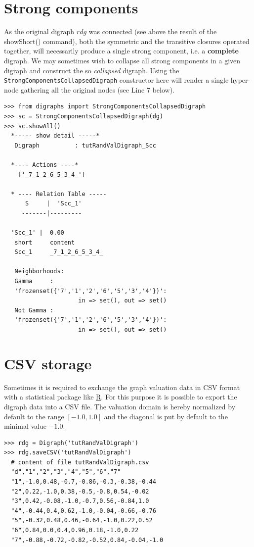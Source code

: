 \section{Strong components}
\label{sec:2.8}

As the original digraph $rdg$ was connected (see above the result of the showShort() command), both the symmetric and the transitive closures operated together, will necessarily produce a single strong component, i.e. a \textbf{complete} digraph. We may sometimes wish to collapse all strong components in a given digraph and construct the so \emph{collapsed} digraph. Using the \texttt{StrongComponentsCollapsedDigraph} constructor here will render a single hyper-node gathering all the original nodes (see Line 7 below).
\begin{lstlisting}[caption={Computing strong components},label=list:2.10]
>>> from digraphs import StrongComponentsCollapsedDigraph
>>> sc = StrongComponentsCollapsedDigraph(dg)
>>> sc.showAll()
  *----- show detail -----*
   Digraph          : tutRandValDigraph_Scc

  *---- Actions ----*
    ['_7_1_2_6_5_3_4_']

  * ---- Relation Table -----
      S     |  'Scc_1'	  
     -------|---------

  'Scc_1' |  0.00	 
   short 	 content
   Scc_1 	 _7_1_2_6_5_3_4_

   Neighborhoods:
   Gamma     :
   'frozenset({'7','1','2','6','5','3','4'})':
                     in => set(), out => set()
   Not Gamma :
   'frozenset({'7','1','2','6','5','3','4'})':
                     in => set(), out => set()
\end{lstlisting}
  
\section{CSV storage}
\label{sec:2.9}

Sometimes it is required to exchange the graph valuation data in CSV format with a statistical package like \href{https://www.r-project.org/}{R}. For this purpose it is possible to export the digraph data into a CSV file. The valuation domain is hereby normalized by default to the range $[-1.0,1.0]$ and the diagonal is put by default to the minimal value $-1.0$.
\begin{lstlisting}
>>> rdg = Digraph('tutRandValDigraph')
>>> rdg.saveCSV('tutRandValDigraph')
  # content of file tutRandValDigraph.csv
  "d","1","2","3","4","5","6","7"
  "1",-1.0,0.48,-0.7,-0.86,-0.3,-0.38,-0.44
  "2",0.22,-1.0,0.38,-0.5,-0.8,0.54,-0.02
  "3",0.42,-0.08,-1.0,-0.7,0.56,-0.84,1.0
  "4",-0.44,0.4,0.62,-1.0,-0.04,-0.66,-0.76
  "5",-0.32,0.48,0.46,-0.64,-1.0,0.22,0.52
  "6",0.84,0.0,0.4,0.96,0.18,-1.0,0.22
  "7",-0.88,-0.72,-0.82,-0.52,0.84,-0.04,-1.0
\end{lstlisting}
  
